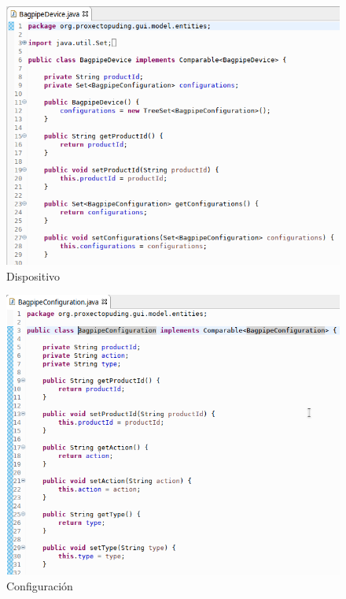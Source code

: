    \begin{figure}[htbp]
    \centering
    \includegraphics[scale=0.6, keepaspectratio=true]{./imagenes/bagpipe-device.png}
    \caption{Dispositivo}
    \label{figura:BagpipeDevice}
   \end{figure}
   
   \begin{figure}[htbp]
    \centering
    \includegraphics[scale=0.6, keepaspectratio=true]{./imagenes/bagpipe-configuration.png}
    \caption{Configuración}
    \label{figura:BagpipeConfiguration}
   \end{figure}
   
